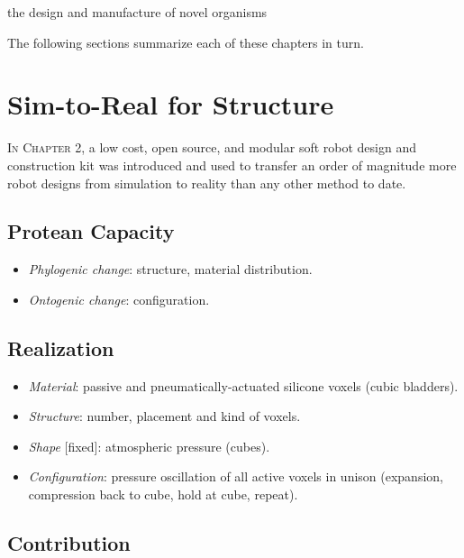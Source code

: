 the design and manufacture of novel organisms

The following sections summarize each of these 
chapters in turn.


\section{Sim-to-Real for Structure}

\textsc{In Chapter 2,}
a low cost, open source, and modular soft robot design and construction kit was introduced and used to
transfer an order of magnitude more robot designs from simulation to reality than any other method to date.

\subsection{Protean Capacity}

\begin{itemize}
    \item \textit{Phylogenic change}: structure, material distribution.
    \item \textit{Ontogenic change}: configuration.
\end{itemize}

\subsection{Realization}

\begin{itemize}
    \item \textit{Material}: passive and pneumatically-actuated silicone voxels (cubic bladders).
    \item \textit{Structure}: number, placement and kind of voxels.
    \item \textit{Shape} [fixed]: atmospheric pressure (cubes).
    \item \textit{Configuration}: pressure oscillation of all active voxels in unison (expansion, compression back to cube, hold at cube, repeat).
\end{itemize}



\subsection{Contribution}



